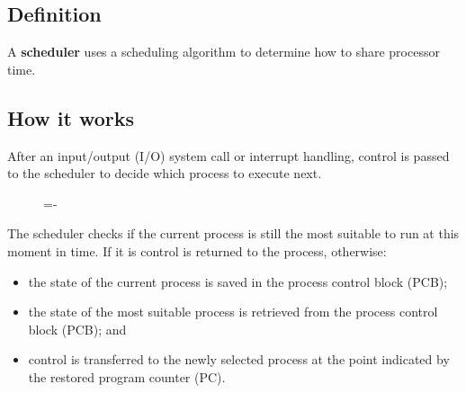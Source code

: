 \documentclass[a4paper]{systems-software}
\begin{document}
\subsection*{Definition}

A \textbf{scheduler} uses a scheduling algorithm to determine how to share processor time.


\subsection*{How it works}

After an input/output (I/O) system call or interrupt handling, control is passed to the scheduler to decide which process to execute next.

\begin{figure}[H]
  \lineskip=-\fboxrule
\end{figure}

The scheduler checks if the current process is still the most suitable to run at this moment in time. If it is control is returned to the process, otherwise:
\begin{itemize}
	\item the state of the current process is saved in the process control block (PCB);
	\item the state of the most suitable process is retrieved from the process control block (PCB); and
	\item control is transferred to the newly selected process at the point indicated by the restored program counter (PC).
\end{itemize}
\end{document}
